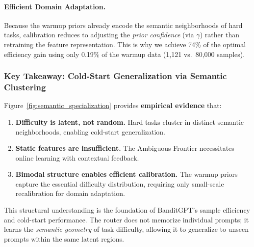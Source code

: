 \paragraph{Efficient Domain Adaptation.}
Because the warmup priors already encode the semantic neighborhoods of hard tasks, calibration reduces to adjusting the \emph{prior confidence} (via $\gamma$) rather than retraining the feature representation.
This is why we achieve 74\% of the optimal efficiency gain using only 0.19\% of the warmup data (1,121 vs.\ 80,000 samples).

\subsubsection{Key Takeaway: Cold-Start Generalization via Semantic Clustering}

Figure~\ref{fig:semantic_specialization} provides \textbf{empirical evidence} that:
\begin{enumerate}
    \item \textbf{Difficulty is latent, not random.} Hard tasks cluster in distinct semantic neighborhoods, enabling cold-start generalization.
    \item \textbf{Static features are insufficient.} The Ambiguous Frontier necessitates online learning with contextual feedback.
    \item \textbf{Bimodal structure enables efficient calibration.} The warmup priors capture the essential difficulty distribution, requiring only small-scale recalibration for domain adaptation.
\end{enumerate}

This structural understanding is the foundation of BanditGPT's sample efficiency and cold-start performance.
The router does not memorize individual prompts; it learns the \emph{semantic geometry} of task difficulty, allowing it to generalize to unseen prompts within the same latent regions.

